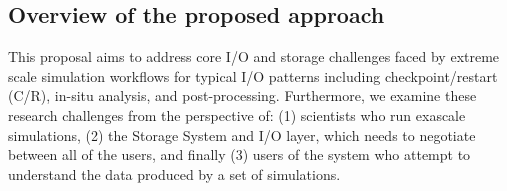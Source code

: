 \subsection{Overview of the proposed approach} 

%
This proposal aims to address core I/O and storage challenges faced by 
extreme scale simulation workflows for typical I/O patterns including 
checkpoint/restart (C/R), in-situ analysis, and post-processing.
%
Furthermore, we examine these research challenges from the perspective of:
%
(1) scientists who run exascale simulations,
%
(2) the Storage System and I/O layer, which needs to negotiate between all of
the users, and finally
%
(3) users of the system who attempt to understand the data
produced by a set of simulations.

